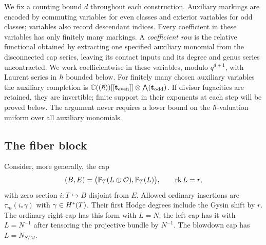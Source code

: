 We fix a counting bound $d$ throughout each construction.  Auxiliary
markings are encoded by commuting variables for even classes and exterior
variables for odd classes; variables also record descendant indices.
Every coefficient in these variables has only finitely many markings.
A \emph{coefficient row} is the relative functional obtained by extracting
one specified auxiliary monomial from the disconnected cap series, leaving
its contact inputs and its degree and genus series uncontracted.
We work coefficientwise in these variables, modulo $q^{d+1}$, with
Laurent series in $\hbar$ bounded below.  For finitely many chosen auxiliary
variables the auxiliary completion is
$\mathbb C((\hbar))[[\mathbf t_{\mathrm{even}}]]\otimes
\bigwedge(\mathbf t_{\mathrm{odd}})$.  If divisor fugacities are retained,
they are invertible; finite support in their exponents at each step will
be proved below.  The argument never requires a lower bound on the
$\hbar$-valuation uniform over all auxiliary monomials.

\subsection{The fiber block}

Consider, more generally, the cap
\begin{equation}\label{cap:bundle}
 (B,E)=\bigl(\mathbb P_T(L\oplus\mathcal O),\mathbb P_T(L)\bigr),\qquad \operatorname{rk} L=r,
\end{equation}
with zero section $i:T\hookrightarrow B$ disjoint from $E$.
Allowed ordinary insertions are $\tau_m(i_*\gamma)$ with
$\gamma\in H^*(T)$.  Their first Hodge degrees include the Gysin shift
by $r$.  The ordinary right cap has this form with $L=N$; the left cap
has it with $L=N^{-1}$ after tensoring the projective bundle by $N^{-1}$.
The blowdown cap has $L=N_{S/M}$.

